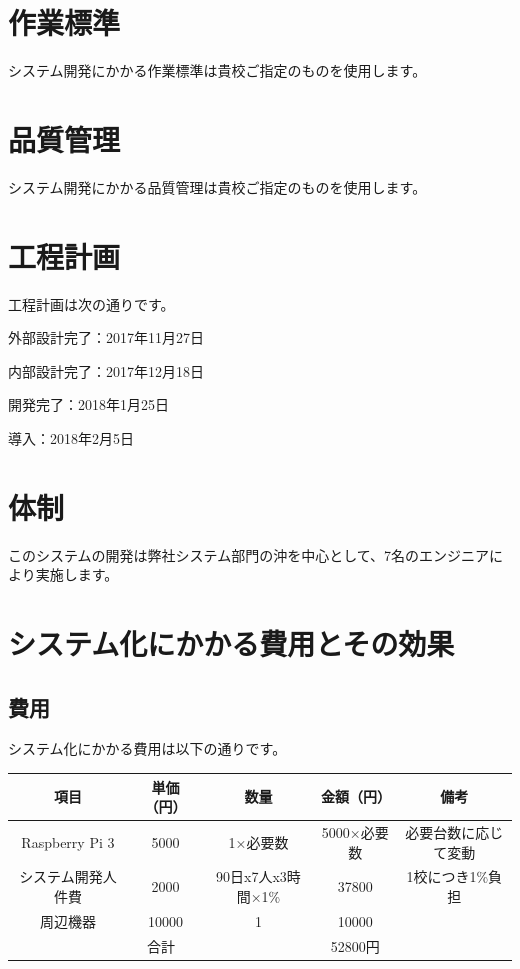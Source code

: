 \documentclass[a4j,titlepage]{ujarticle}
\begin{document}
\section{作業標準}
システム開発にかかる作業標準は貴校ご指定のものを使用します。

\section{品質管理}
システム開発にかかる品質管理は貴校ご指定のものを使用します。

\section{工程計画}
工程計画は次の通りです。

外部設計完了：2017年11月27日

内部設計完了：2017年12月18日

開発完了：2018年1月25日

導入：2018年2月5日

\section{体制}
このシステムの開発は弊社システム部門の沖を中心として、7名のエンジニアにより実施します。

\section{システム化にかかる費用とその効果}
\subsection{費用}
システム化にかかる費用は以下の通りです。

\begin{table}[htb]
  \begin{tabular}{|c|c|c|c|c|} \hline
    項目 & 単価（円） & 数量 & 金額（円） & 備考 \\ \hline
     Raspberry Pi 3 &  5000&  1×必要数&  5000×必要数& 必要台数に応じて変動 \\ \hline
     システム開発人件費&  2000& 90日x7人x3時間×1\%&37800&1校につき1\%負担  \\ \hline
     周辺機器&  10000&  1&  10000&  \\ \hline
    \multicolumn{3}{|c|}{合計}& 52800円 &  \\ \hline
  \end{tabular}
\end{table}
\end{document}

